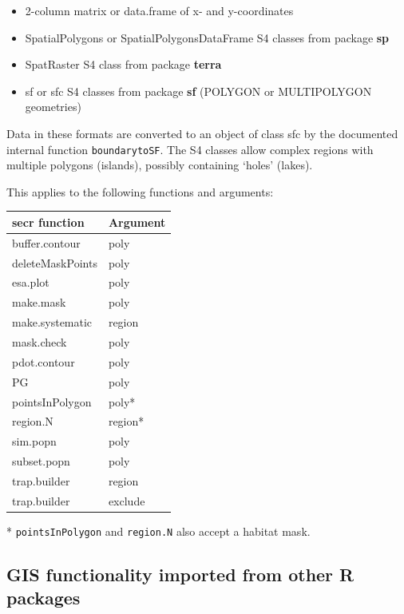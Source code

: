 \documentclass[
]{book}
\providecommand{\tightlist}{%
  \setlength{\itemsep}{0pt}\setlength{\parskip}{0pt}}
\begin{document}
\begin{itemize}
\tightlist
\item
  2-column matrix or data.frame of x- and y-coordinates
\item
  SpatialPolygons or SpatialPolygonsDataFrame S4 classes from package \textbf{sp}
\item
  SpatRaster S4 class from package \textbf{terra}
\item
  sf or sfc S4 classes from package \textbf{sf} (POLYGON or MULTIPOLYGON geometries)
\end{itemize}

Data in these formats are converted to an object of class sfc by the documented internal function \texttt{boundarytoSF}. The S4 classes allow complex regions with multiple polygons (islands), possibly containing `holes' (lakes).

This applies to the following functions and arguments:

\begin{longtable}[]{@{}ll@{}}
\toprule\noalign{}
\textbf{secr} function & Argument \\
\midrule\noalign{}
\endhead
\bottomrule\noalign{}
\endlastfoot
buffer.contour & poly \\
deleteMaskPoints & poly \\
esa.plot & poly \\
make.mask & poly \\
make.systematic & region \\
mask.check & poly \\
pdot.contour & poly \\
PG & poly \\
pointsInPolygon & poly* \\
region.N & region* \\
sim.popn & poly \\
subset.popn & poly \\
trap.builder & region \\
trap.builder & exclude \\
\end{longtable}

* \texttt{pointsInPolygon} and \texttt{region.N} also accept a habitat mask.

\subsection{GIS functionality imported from other R packages}\label{gis-functionality-imported-from-other-r-packages}
\end{document}
